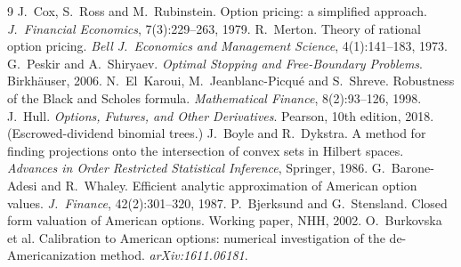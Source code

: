 \documentclass[11pt]{article}
\begin{document}
\begin{thebibliography}{9}
 J.~Cox, S.~Ross and M.~Rubinstein.  Option
pricing: a simplified approach.  \emph{J.\ Financial Economics},
7(3):229--263, 1979.
 R.~Merton.  Theory of rational option pricing.
\emph{Bell J.\ Economics and Management Science}, 4(1):141--183, 1973.
 G.~Peskir and A.~Shiryaev.  \emph{Optimal
Stopping and Free-Boundary Problems}.  Birkh\"auser, 2006.
 N.~El~Karoui, M.~Jeanblanc-Picqu\'e and
S.~Shreve.  Robustness of the Black and Scholes formula.
\emph{Mathematical Finance}, 8(2):93--126, 1998.
 J.~Hull.  \emph{Options, Futures, and Other
Derivatives}.  Pearson, 10th edition, 2018.  (Escrowed-dividend binomial
trees.)
 J.~Boyle and R.~Dykstra.  A method for finding
projections onto the intersection of convex sets in Hilbert spaces.
\emph{Advances in Order Restricted Statistical Inference}, Springer,
1986.
 G.~Barone-Adesi and R.~Whaley.  Efficient
analytic approximation of American option values.  \emph{J.\ Finance},
42(2):301--320, 1987.
 P.~Bjerksund and G.~Stensland.  Closed
form valuation of American options.  Working paper, NHH, 2002.
 O.~Burkovska et al.  Calibration to American
options: numerical investigation of the de-Americanization method.
\emph{arXiv:1611.06181}.
\end{thebibliography}
\end{document}
